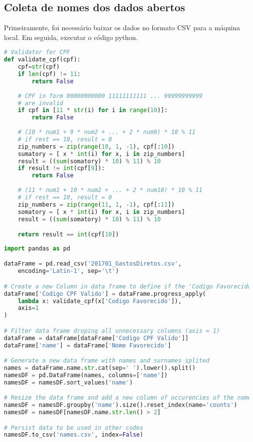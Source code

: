 \begin{apendicesenv}

\partapendices
\chapter{Coleta de nomes dos dados abertos}
\label{sec:apendiceA}

Primeiramente, foi necessário baixar os dados no formato CSV para a máquina local. Em seguida, executar o código python.

\begin{lstlisting}[language=Python]
# Validator for CPF
def validate_cpf(cpf):
    cpf=str(cpf)
    if len(cpf) != 11:
        return False
    
    # CPF in form 00000000000 11111111111 ... 99999999999 
    # are invalid
    if cpf in [11 * str(i) for i in range(10)]:
        return False    
        
    # (10 * num1 + 9 * num2 + ... + 2 * num9) * 10 % 11
    # if rest == 10, result = 0
    zip_numbers = zip(range(10, 1, -1), cpf[:10])
    sumatory = [ x * int(i) for x, i in zip_numbers]
    result = ((sum(somatory) * 10) % 11) % 10
    if result != int(cpf[9]):
        return False
    
    # (11 * num1 + 10 * num2 + ... + 2 * num10) * 10 % 11
    # if rest == 10, result = 0
    zip_numbers = zip(range(11, 1, -1), cpf[:11])
    somatory = [ x * int(i) for x, i in zip_numbers]
    result = ((sum(somatory) * 10) % 11) % 10

    return result == int(cpf[10])
\end{lstlisting}

\begin{lstlisting}[language=Python]
import pandas as pd

dataFrame = pd.read_csv('201701_GastosDiretos.csv', 
	encoding='Latin-1', sep='\t')

# Create a new Column in data frame to define if the 'Codigo Favorecido' is a CPF
dataFrame['Codigo CPF Valido'] = dataFrame.progress_apply(
    lambda x: validate_cpf(x['Codigo Favorecido']),
    axis=1
)

# Filter data frame droping all unnecessary columns (axis = 1)
dataFrame = dataFrame[dataFrame['Codigo CPF Valido']]
dataFrame['name'] = dataFrame['Nome Favorecido']

# Generate a new data frame with names and surnames splited
names = dataFrame.name.str.cat(sep=' ').lower().split()
namesDF = pd.DataFrame(names, columns=['name'])
namesDF = namesDF.sort_values('name')

# Resize the data frame and add a new column of occurencies of the name 
namesDF = namesDF.groupby('name').size().reset_index(name='counts')
namesDF = namesDF[namesDF.name.str.len() > 2]

# Persist data to be used in other codes
namesDF.to_csv('names.csv', index=False)
\end{lstlisting}

\end{apendicesenv}


